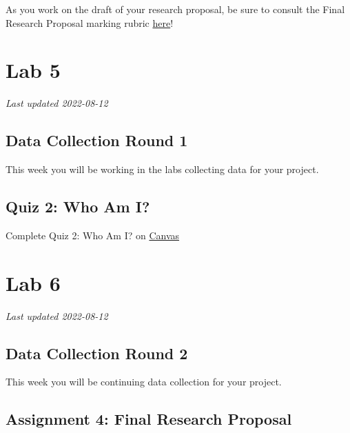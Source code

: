 \documentclass[
]{book}
\begin{document}
As you work on the draft of your research proposal, be sure to consult the Final Research Proposal marking rubric \href{https://ubco-biology.github.io/BIOL-205-Lab-Manual/research-proposal-rubric.html}{here}!

\hypertarget{part-lab-5}{%
\part*{Lab 5}\label{part-lab-5}}

\emph{Last updated 2022-08-12}

\hypertarget{data-collection-round-1}{%
\chapter*{Data Collection Round 1}\label{data-collection-round-1}}

This week you will be working in the labs collecting data for your project.

\hypertarget{quiz-2-who-am-i}{%
\chapter*{Quiz 2: Who Am I?}\label{quiz-2-who-am-i}}

Complete Quiz 2: Who Am I? on \href{https://canvas.ubc.ca/courses/113910}{Canvas}

\hypertarget{part-lab-6}{%
\part*{Lab 6}\label{part-lab-6}}

\emph{Last updated 2022-08-12}

\hypertarget{data-collection-round-2}{%
\chapter*{Data Collection Round 2}\label{data-collection-round-2}}

This week you will be continuing data collection for your project.

\hypertarget{assignment-4-final-research-proposal}{%
\chapter*{Assignment 4: Final Research Proposal}\label{assignment-4-final-research-proposal}}
\end{document}

